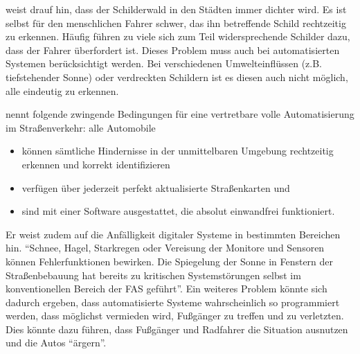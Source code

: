 \Textcite[S. 55]{Bremer.2004} weist drauf hin, dass der Schilderwald in den Städten immer dichter wird. Es ist selbst für den menschlichen Fahrer schwer, das ihn betreffende Schild rechtzeitig zu erkennen. Häufig führen zu viele sich zum Teil widersprechende Schilder dazu, dass der Fahrer überfordert ist. Dieses Problem muss auch bei automatisierten Systemen berücksichtigt werden. Bei verschiedenen Umwelteinflüssen (z.B. tiefstehender Sonne) oder verdreckten Schildern ist es diesen auch nicht möglich, alle eindeutig zu erkennen. 

\Textcite[S. 639]{Kossak.2017} nennt folgende  zwingende Bedingungen für eine vertretbare volle Automatisierung im Straßenverkehr: alle Automobile
\begin{itemize}
	\item können sämtliche Hindernisse in der unmittelbaren Umgebung rechtzeitig erkennen und korrekt identifizieren
	\item verfügen über jederzeit perfekt aktualisierte Straßenkarten und
	\item sind mit einer Software ausgestattet, die absolut einwandfrei funktioniert.
\end{itemize}

Er weist zudem auf die Anfälligkeit digitaler Systeme in bestimmten Bereichen hin. \enquote{Schnee, Hagel, Starkregen oder Vereisung der Monitore und Sensoren können Fehlerfunktionen bewirken. Die Spiegelung der Sonne in Fenstern der Straßenbebauung hat bereits zu kritischen Systemstörungen selbst im konventionellen Bereich der FAS geführt}. Ein weiteres Problem könnte sich dadurch ergeben, dass automatisierte Systeme wahrscheinlich so programmiert werden, dass möglichst vermieden wird, Fußgänger zu treffen und zu verletzten. Dies könnte dazu führen, dass Fußgänger und Radfahrer die Situation ausnutzen und die Autos \enquote{ärgern}. 
